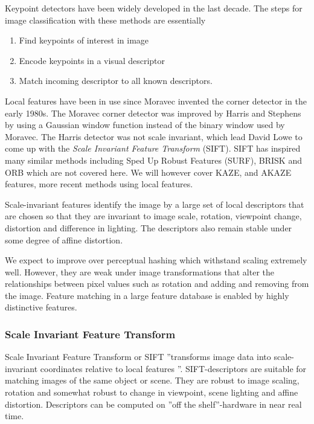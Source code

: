 \documentclass[english,12pt,a4paper,pdftex,elec,utf8, table]{aaltothesis}
\begin{document}
Keypoint detectors have been widely developed in the last decade. The steps for image classification with these methods are essentially

\begin{enumerate}
\item Find keypoints of interest in image
\item Encode keypoints in a visual descriptor
\item Match incoming descriptor to all known descriptors.
\end{enumerate}

Local features have been in use since Moravec invented the corner detector in the early 1980s. The Moravec corner detector was improved by Harris and Stephens by using a Gaussian window function instead of the binary window used by Moravec. The Harris detector was not scale invariant, which lead David Lowe to come up with the \emph{Scale Invariant Feature Transform} (SIFT). SIFT has inspired many similar methods including Sped Up Robust Features (SURF), BRISK and ORB which are not covered here. We will however cover KAZE, and AKAZE features, more recent methods using local features.

Scale-invariant features identify the image by a large set of local descriptors that are chosen so that they are invariant to image scale, rotation, viewpoint change, distortion and difference in lighting. The descriptors also remain stable under some degree of affine distortion. \cite{Lowe2004}

We expect to improve over perceptual hashing which withstand scaling extremely well. However, they are weak under image transformations that alter the relationships between pixel values such as rotation and adding and removing from the image. Feature matching in a large feature database is enabled by highly distinctive features.

\subsubsection{Scale Invariant Feature Transform} \label{SIFTSection}
Scale Invariant Feature Transform or SIFT ''transforms image data into scale-invariant coordinates relative to local features \cite{Lowe2004}''. SIFT-descriptors are suitable for matching images of the same object or scene. They are robust to image scaling, rotation and somewhat robust to change in viewpoint, scene lighting and affine distortion. Descriptors can be computed on ''off the shelf''-hardware in near real time. \cite{Lowe2004}
\end{document}
